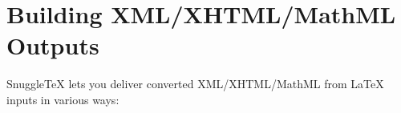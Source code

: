 
\section*{Building XML/XHTML/MathML Outputs}

SnuggleTeX lets you deliver converted XML/XHTML/MathML from LaTeX
inputs in various ways:

